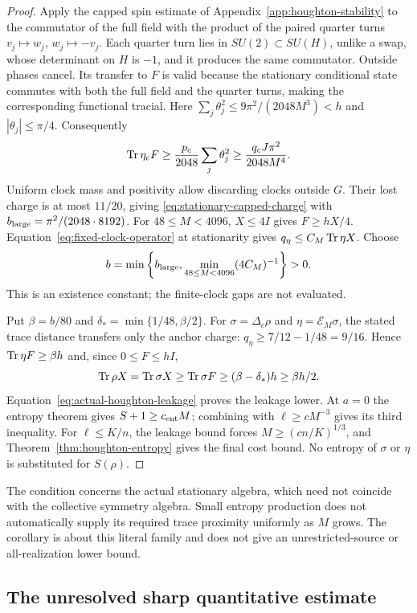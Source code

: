 \begin{proof}
Apply the capped spin estimate of Appendix~\ref{app:houghton-stability}
to the commutator of the full field with the product of the paired
quarter turns $v_j\mapsto w_j$, $w_j\mapsto-v_j$. Each quarter turn lies
in $SU(2)\subset SU(H)$, unlike a swap, whose determinant on $H$ is
$-1$, and it produces the same commutator. Outside phases cancel. Its
transfer to $F$ is valid because the stationary conditional state
commutes with both the full field and the quarter turns, making the
corresponding functional tracial.
Here $\sum_j\theta_j^2\leq9\pi^2/(2048M^3)<h$ and
$|\theta_j|\leq\pi/4$. Consequently
\[
 \operatorname{Tr}\eta_c F\geq\frac{p_c}{2048}\sum_j\theta_j^2
      \geq\frac{q_cJ\pi^2}{2048M^4}.
\]
Uniform clock mass and positivity allow discarding clocks outside $G$.
Their lost charge is at most $11/20$, giving
\eqref{eq:stationary-capped-charge} with
$b_{\rm large}=\pi^2/(2048\cdot8192)$.
For $48\leq M<4096$, $X\leq4I$ gives $F\geq hX/4$.
Equation~\eqref{eq:fixed-clock-operator} at stationarity gives
$q_\eta\leq C_M\operatorname{Tr}\eta X$. Choose
\[
 b=\min\left\{b_{\rm large},\min_{48\leq M<4096}(4C_M)^{-1}\right\}>0.
\]
This is an existence constant; the finite-clock gaps are not evaluated.

Put $\beta=b/80$ and $\delta_* =\min\{1/48,\beta/2\}$.
For $\sigma=\Delta_c\rho$ and $\eta=\mathcal E_M\sigma$,
the stated trace distance transfers only the anchor charge:
$q_\eta\geq7/12-1/48=9/16$.
Hence $\operatorname{Tr}\eta F\geq\beta h$ and, since $0\leq F\leq hI$,
\[
 \operatorname{Tr}\rho X=\operatorname{Tr}\sigma X\geq\operatorname{Tr}\sigma F
       \geq(\beta-\delta_*)h\geq\beta h/2.
\]
Equation~\eqref{eq:actual-houghton-leakage} proves the leakage lower.
At $a=0$ the entropy theorem gives $S+1\geq c_{\rm ent}M$;
combining with $\ell\geq cM^{-3}$ gives its third inequality.
For $\ell\leq K/n$, the leakage bound forces
$M\geq(cn/K)^{1/3}$, and
Theorem~\ref{thm:houghton-entropy} gives the final cost bound.
No entropy of $\sigma$ or $\eta$ is substituted for $S(\rho)$.
\end{proof}

The condition concerns the actual stationary algebra, which need not
coincide with the collective symmetry algebra. Small entropy production
does not automatically supply its required trace proximity uniformly
as $M$ grows. The corollary is about this literal family and does not
give an unrestricted-source or all-realization lower bound.

\subsection{The unresolved sharp quantitative estimate}

